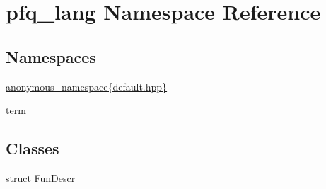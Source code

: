 \hypertarget{namespacepfq__lang}{\section{pfq\+\_\+lang Namespace Reference}
\label{namespacepfq__lang}
}
\subsection*{Namespaces}
\begin{DoxyCompactItemize}
\item 
 \hyperlink{namespacepfq__lang_1_1anonymous__namespace_02default_8hpp_03}{anonymous\+\_\+namespace\{default.\+hpp\}}
\item 
 \hyperlink{namespacepfq__lang_1_1term}{term}
\end{DoxyCompactItemize}
\subsection*{Classes}
\begin{DoxyCompactItemize}
\item 
struct \hyperlink{structpfq__lang_1_1FunDescr}{Fun\+Descr}
\end{DoxyCompactItemize}

